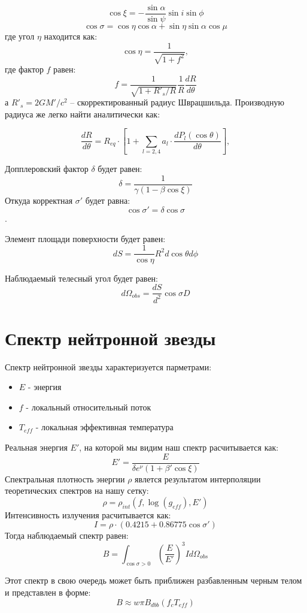 $$\cos \xi = - \frac{\sin \alpha}{\sin \psi} \sin i  \sin\phi $$
$$\cos \sigma = \cos \eta \cos \alpha + \sin \eta \sin \alpha \cos \mu $$
где угол $\eta$ находится как:
$$\cos \eta =  \frac{1}{\sqrt{1 + f^2}},$$
где фактор $f$ равен:
$$f = \frac{1}{\sqrt{1 + R'_s/R}} \frac{1}{R} \frac{dR}{d\theta}$$
а $R'_s = 2GM'/c^2$ -- скорректированный радиус Шврацшильда. Производную радиуса же легко найти аналитически как:

$$\frac{dR}{d\theta} = R_{eq} \cdot \left[1 + \sum_{l=2,4} a_l \cdot \frac{d P_l(\cos\theta)}{d\theta} \right],$$

Допплеровский фактор $\delta$ будет равен:
$$\delta = \frac{1}{\gamma (1 - \beta \cos \xi)}$$
Откуда корректная $\sigma'$ будет равна:
$$\cos \sigma' = \delta \cos \sigma $$.


Элемент площади поверхности будет равен:
$$dS = \frac{1}{\cos \eta} R^2 d\cos\theta d\phi$$

Наблюдаемый телесный угол будет равен:
$$d\Omega_{obs} =  \frac{dS}{d^2} \cos \sigma D $$ 

\section{Спектр нейтронной звезды}

Спектр нейтронной звезды характеризуется парметрами:
\begin{itemize}
    \item $E$ - энергия
    \item $f$ - локальный относительный поток
    \item $T_{eff}$ - локальная эффективная температура
\end{itemize}

Реальная энергия $E'$, на которой мы видим наш спектр расчитывается как:
$$E' = \frac{E}{\delta e^{\nu}(1 + \beta' \cos \xi)}$$
Спектральная плотность энергии $\rho$ явлется результатом интерполяции теоретических спектров на нашу сетку:
$$\rho = \rho_{int}(f, \log(g_{eff}), E')$$
Интенсивность излучения расчитывается как:
$$I = \rho \cdot (0.4215 + 0.86775 \cos \sigma')$$
Тогда наблюдаемый спектр равен:
$$B = \int_{\cos \sigma > 0} \left(\frac{E}{E'}\right)^3 I d\Omega_{obs}$$

Этот спектр в свою очередь может быть приближен разбавленным черным телом и представлен в форме:
$$B \approx w \pi B_{dbb} (f_c T_{eff})$$



